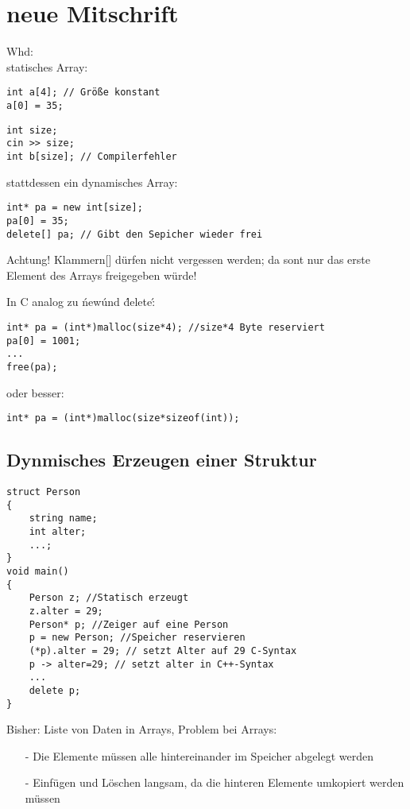 \section{neue Mitschrift}
Whd: \\
statisches Array: \\
\begin{lstlisting}
int a[4]; // Größe konstant
a[0] = 35;
\end{lstlisting}

\begin{lstlisting}
int size;
cin >> size;
int b[size]; // Compilerfehler
\end{lstlisting}
stattdessen ein dynamisches Array: \\
\begin{lstlisting}
int* pa = new int[size];
pa[0] = 35;
delete[] pa; // Gibt den Sepicher wieder frei
\end{lstlisting}
Achtung! Klammern[] dürfen nicht vergessen werden; da sont nur das erste Element des Arrays freigegeben würde!
\begin{underline} In C analog zu \'new\' und \'delete\':\end{underline}
\begin{lstlisting}
int* pa = (int*)malloc(size*4); //size*4 Byte reserviert
pa[0] = 1001;
...
free(pa);
\end{lstlisting}
oder besser:
\begin{lstlisting}
int* pa = (int*)malloc(size*sizeof(int));
\end{lstlisting}
\subsection{Dynmisches Erzeugen einer Struktur}
\begin{lstlisting}
struct Person
{
    string name;
    int alter;
    ...;
}
void main()
{
    Person z; //Statisch erzeugt
    z.alter = 29;
    Person* p; //Zeiger auf eine Person
    p = new Person; //Speicher reservieren
    (*p).alter = 29; // setzt Alter auf 29 C-Syntax
    p -> alter=29; // setzt alter in C++-Syntax
    ...
    delete p;
}
\end{lstlisting}
Bisher: Liste von Daten in Arrays, Problem bei Arrays: \\
\begin{itemize}
\item[-]Die Elemente müssen alle hintereinander im Speicher abgelegt werden
\item[-]Einfügen und Löschen langsam, da die hinteren Elemente umkopiert werden müssen
\end{itemize}

